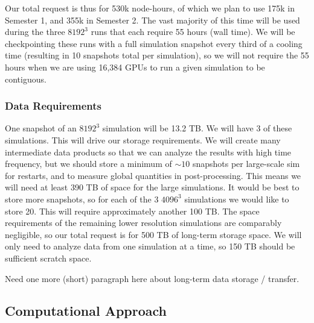 \documentclass[11pt,letterpaper,english]{article}
\begin{document}
Our total request is thus for 530k node-hours, of which we plan to use 175k in Semester 1, and 355k in Semester 2. The vast majority of this time will be used during the three $8192^3$ runs that each require 55 hours (wall time). We will be checkpointing these runs with a full simulation snapshot every third of a cooling time (resulting in 10 snapshots total per simulation), so we will not require the 55 hours when we are using 16,384 GPUs to run a given simulation to be contiguous.

\subsubsection{Data Requirements}

One snapshot of an $8192^3$ simulation will be 13.2 TB. We will have 3 of these simulations. This will drive our storage requirements. We will create many intermediate data products so that we can analyze the results with high time frequency, but we should store a minimum of ${\sim}10$ snapshots per large-scale sim for restarts, and to measure global quantities in post-processing. This means we will need at least 390 TB of space for the large simulations. It would be best to store more snapshots, so for each of the 3 $4096^3$ simulations we would like to store 20. This will require approximately another 100 TB. The space requirements of the remaining lower resolution simulations are comparably negligible, so our total request is for 500 TB of long-term storage space. We will only need to analyze data from one simulation at a time, so 150 TB should be sufficient scratch space.

Need one more (short) paragraph here about long-term data storage / transfer.

\vspace{-.25in}
\subsection{Computational Approach}
\vspace{-.2in}


\end{document}
